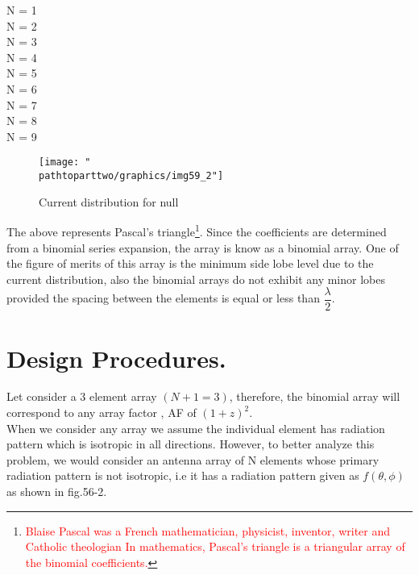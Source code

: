 N = 1\; \; \; \; \; \; \; \; \; \; \; \; \; \; \;\; \;  \; \; \\

N = 2\; \; \; \; \; \; \; \; \; \; \; \; \; \; \; \; \;  \; \; \\

N = 3\; \; \; \; \; \; \; \; \; \; \; \; \;  \; \;  \; \;  \; \; \\

N = 4\; \; \; \; \; \; \; \; \; \; \;  \; \;  \; \;  \; \;  \; \;  \\

N = 5\; \; \; \; \; \; \; \; \;  \; \;  \; \;  \; \;  \; \;  \; \; \\

N = 6\; \; \; \; \; \; \;  \; \;  \; \;  \; \;  \; \;  \; \;  \; \; \\

N = 7\; \; \; \; \;  \; \;  \; \;  \; \;  \; \;  \; \;  \; \;  \; \; \\

N = 8\; \; \;  \; \;  \; \;  \; \;  \; \;  \; \;  \; \;  \; \;  \; \; \\

N = 9\; \;   \;  \; \;  \; \;  \; \;\; \; \;  \; \;  \; \;  \; \; \\

\begin{figure}[h]
\centering
\texttt{[image: "\\pathtoparttwo/graphics/img59\_2"]}
\caption{Current distribution for null}
\label{fig:fig-1}
\end{figure}
The above represents Pascal's triangle\footnote{\textcolor{red}{Blaise Pascal was a French mathematician, physicist, inventor, writer and Catholic theologian In mathematics, Pascal's triangle is a triangular array of the binomial coefficients.}}. Since the coefficients are determined from a binomial series expansion, the array is know as a binomial array. One of the figure of merits of this array is the minimum side lobe level due to the current distribution, also the binomial arrays do not exhibit any minor lobes provided the spacing between the elements is equal or less than $\dfrac{\lambda}{2}$.\\

\section{Design Procedures.}
Let consider a 3 element array $(N + 1 = 3)$, therefore, the binomial array will correspond to any array factor , AF of $(1 + z)^2$.\\
When we consider any array we assume the individual element has radiation pattern which is isotropic in all directions. However, to better analyze this problem, we would consider an antenna array of N elements whose primary radiation pattern is not isotropic, i.e it has a radiation pattern given as $f(\theta,\phi)$ as shown in fig.56-2.

